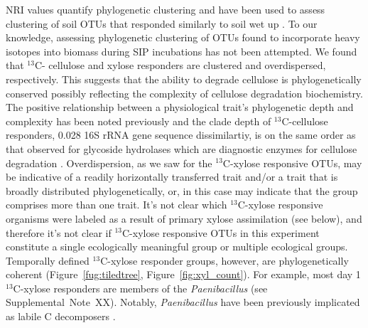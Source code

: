 NRI values quantify phylogenetic clustering \citep{Webb2000} and have 
been used to assess clustering of soil OTUs that responded similarly to soil
wet up \citep{Evans2014a,Placella2012}. To our knowledge, assessing
phylogenetic clustering of OTUs found to incorporate heavy isotopes into
biomass during SIP incubations has not been attempted. We found that $^{13}$C-
cellulose and xylose responders are clustered and overdispersed, respectively.
This suggests that the ability to degrade cellulose is phylogenetically
conserved possibly reflecting the complexity of cellulose degradation
biochemistry. The positive relationship between a physiological trait's
phylogenetic depth and complexity has been noted previously
\citep{Martiny2013a} and the clade depth of $^{13}$C-cellulose responders,
0.028 16S rRNA gene sequence dissimilartiy, is on the same order as that
observed for glycoside hydrolases which are diagnostic enzymes for cellulose
degradation \citep{Berlemont2013}. Overdispersion, as we saw for the
$^{13}$C-xylose responsive OTUs, may be indicative of a readily horizontally
transferred trait and/or a trait that is broadly distributed
phylogenetically, or, in this case may indicate that the group comprises more
than one trait. It's not clear which $^{13}$C-xylose responsive organisms
were labeled as a result of primary xylose assimilation (see below), and
therefore it's not clear if $^{13}$C-xylose responsive OTUs in this
experiment constitute a single ecologically meaningful group or multiple
ecological groups. Temporally defined $^{13}$C-xylose responder groups,
however, are phylogenetically coherent (Figure~\ref{fug:tiledtree},
Figure~\ref{fig:xyl_count}). For example, most day
1 $^{13}$C-xylose responders are members of the \textit{Paenibacillus} (see
Supplemental~Note~XX). Notably, \textit{Paenibacillus} have been previously
implicated as labile C decomposers \citep{Verastegui_2014}.

